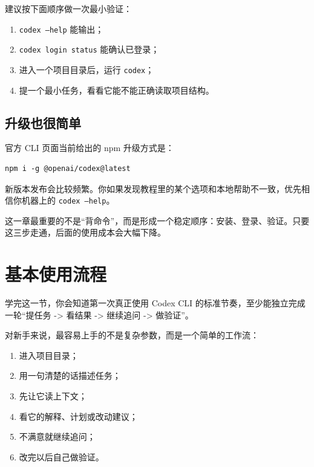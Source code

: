 \documentclass[UTF8,a4paper,12pt]{ctexart}
\begin{document}
建议按下面顺序做一次最小验证：

\begin{enumerate}
  \item \texttt{codex --help} 能输出；
  \item \texttt{codex login status} 能确认已登录；
  \item 进入一个项目目录后，运行 \texttt{codex}；
  \item 提一个最小任务，看看它能不能正确读取项目结构。
\end{enumerate}

\subsection{升级也很简单}

官方 CLI 页面当前给出的 npm 升级方式是：

\begin{lstlisting}[style=cli]
npm i -g @openai/codex@latest
\end{lstlisting}

\begin{tipbox}
新版本发布会比较频繁。你如果发现教程里的某个选项和本地帮助不一致，优先相信你机器上的 \texttt{codex --help}。
\end{tipbox}

\begin{sumbox}
这一章最重要的不是“背命令”，而是形成一个稳定顺序：安装、登录、验证。只要这三步走通，后面的使用成本会大幅下降。
\end{sumbox}

\section{基本使用流程}

\begin{learnbox}
学完这一节，你会知道第一次真正使用 Codex CLI 的标准节奏，至少能独立完成一轮“提任务 -> 看结果 -> 继续追问 -> 做验证”。
\end{learnbox}

对新手来说，最容易上手的不是复杂参数，而是一个简单的工作流：

\begin{enumerate}
  \item 进入项目目录；
  \item 用一句清楚的话描述任务；
  \item 先让它读上下文；
  \item 看它的解释、计划或改动建议；
  \item 不满意就继续追问；
  \item 改完以后自己做验证。
\end{enumerate}
\end{document}
